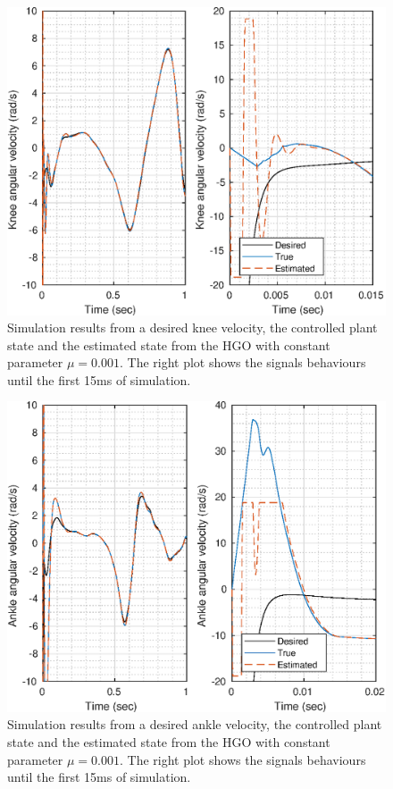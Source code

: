 \documentclass[letterpaper, 10 pt, journal, twocolumn]{IEEEtran}  %
\theoremstyle{plain}
\theoremstyle{definition}
\theoremstyle{remark}
\begin{document}
%
%
\begin{figure}[h!]
	\begin{center}
	\includegraphics[width = \columnwidth]{Figs/dq_knee_mu_1e-03.eps}
	\caption{Simulation results from a desired knee velocity, the controlled plant state and the estimated state from the HGO with constant parameter $\mu=0.001$. The right plot shows the signals behaviours until the first 15ms of simulation.}
	\label{fig:dknee}
	\end{center}
\end{figure}
%
%
\begin{figure}[h!]
	\begin{center}
	\includegraphics[width = \columnwidth]{Figs/dq_ankle_mu_1e-03.eps}
	\caption{Simulation results from a desired ankle velocity, the controlled plant state and the estimated state from the HGO with constant parameter $\mu=0.001$. The right plot shows the signals behaviours until the first 15ms of simulation.}
	\label{fig:dankle}
	\end{center}
\end{figure}
\end{document}
